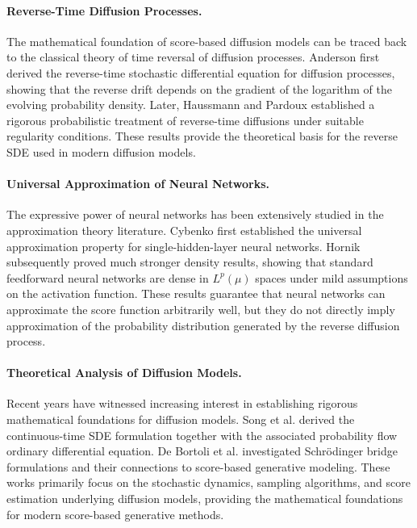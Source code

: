 \documentclass[11pt]{article}
\begin{document}
\paragraph{Reverse-Time Diffusion Processes.}
The mathematical foundation of score-based diffusion models can be traced back
to the classical theory of time reversal of diffusion processes. Anderson
\cite{Anderson1982} first derived the reverse-time stochastic differential
equation for diffusion processes, showing that the reverse drift depends on the
gradient of the logarithm of the evolving probability density. Later,
Haussmann and Pardoux \cite{HaussmannPardoux1985} established a rigorous
probabilistic treatment of reverse-time diffusions under suitable regularity
conditions. These results provide the theoretical basis for the reverse SDE
used in modern diffusion models.

\paragraph{Universal Approximation of Neural Networks.}
The expressive power of neural networks has been extensively studied in the
approximation theory literature. Cybenko \cite{Cybenko1989} first established
the universal approximation property for single-hidden-layer neural networks.
Hornik \cite{Hornik1991} subsequently proved much stronger density results,
showing that standard feedforward neural networks are dense in
$L^p(\mu)$ spaces under mild assumptions on the activation function. These
results guarantee that neural networks can approximate the score function
arbitrarily well, but they do not directly imply approximation of the
probability distribution generated by the reverse diffusion process.

\paragraph{Theoretical Analysis of Diffusion Models.}
Recent years have witnessed increasing interest in establishing rigorous
mathematical foundations for diffusion models. Song et al.
\cite{Song2021} derived the continuous-time SDE formulation together with the
associated probability flow ordinary differential equation. De Bortoli et al.
\cite{DeBortoli2021} investigated Schr\"odinger bridge formulations and their
connections to score-based generative modeling. These works primarily focus on
the stochastic dynamics, sampling algorithms, and score estimation underlying
diffusion models, providing the mathematical foundations for modern
score-based generative methods.
\end{document}
